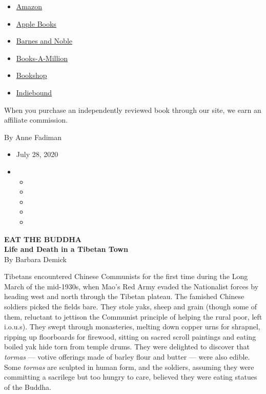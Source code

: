 \begin{itemize}
\tightlist
\item
  \href{https://www.amazon.com/gp/search?index=books\&tag=NYTBSREV-20\&field-keywords=Eat+the+Buddha+Barbara+Demick}{Amazon}
\item
  \href{https://du-gae-books-dot-nyt-du-prd.appspot.com/buy?title=Eat+the+Buddha\&author=Barbara+Demick}{Apple
  Books}
\item
  \href{https://www.anrdoezrs.net/click-7990613-11819508?url=https\%3A\%2F\%2Fwww.barnesandnoble.com\%2Fw\%2F\%3Fean\%3D0812998758}{Barnes
  and Noble}
\item
  \href{https://www.anrdoezrs.net/click-7990613-35140?url=https\%3A\%2F\%2Fwww.booksamillion.com\%2Fp\%2FEat\%2Bthe\%2BBuddha\%2FBarbara\%2BDemick\%2F0812998758}{Books-A-Million}
\item
  \href{https://bookshop.org/a/3546/0812998758}{Bookshop}
\item
  \href{https://www.indiebound.org/book/0812998758?aff=NYT}{Indiebound}
\end{itemize}

When you purchase an independently reviewed book through our site, we
earn an affiliate commission.

By Anne Fadiman

\begin{itemize}
\item
  July 28, 2020
\item
  \begin{itemize}
  \item
  \item
  \item
  \item
  \item
  \end{itemize}
\end{itemize}

\textbf{EAT THE BUDDHA}\\
\textbf{Life and Death in a Tibetan Town}\\
By Barbara Demick

Tibetans encountered Chinese Communists for the first time during the
Long March of the mid-1930s, when Mao's Red Army evaded the Nationalist
forces by heading west and north through the Tibetan plateau. The
famished Chinese soldiers picked the fields bare. They stole yaks, sheep
and grain (though some of them, reluctant to jettison the Communist
principle of helping the rural poor, left i.o.u.s). They swept through
monasteries, melting down copper urns for shrapnel, ripping up
floorboards for firewood, sitting on sacred scroll paintings and eating
boiled yak hide torn from temple drums. They were delighted to discover
that \emph{tormas} --- votive offerings made of barley flour and butter
--- were also edible. Some \emph{tormas} are sculpted in human form, and
the soldiers, assuming they were committing a sacrilege but too hungry
to care, believed they were eating statues of the Buddha.

